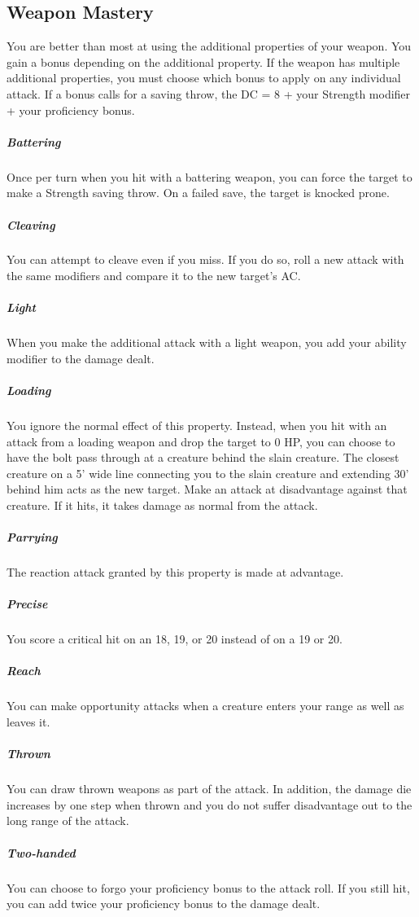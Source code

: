 \subsection{Weapon Mastery}

You are better than most at using the additional properties of your weapon. You gain a bonus depending on the additional property. If the weapon has multiple additional properties, you must choose which bonus to apply on any individual attack. If a bonus calls for a saving throw, the DC = 8 + your Strength modifier + your proficiency bonus.

\subparagraph*{Battering} Once per turn when you hit with a battering weapon, you can force the target to make a Strength saving throw. On a failed save, the target is knocked prone.

\subparagraph*{Cleaving} You can attempt to cleave even if you miss. If you do so, roll a new attack with the same modifiers and compare it to the new target's AC.

\subparagraph*{Light} When you make the additional attack with a light weapon, you add your ability modifier to the damage dealt.

\subparagraph*{Loading} You ignore the normal effect of this property. Instead, when you hit with an attack from a loading weapon and drop the target to 0 HP, you can choose to have the bolt pass through at a creature behind the slain creature. The closest creature on a 5' wide line connecting you to the slain creature and extending 30' behind him acts as the new target. Make an attack at disadvantage against that creature. If it hits, it takes damage as normal from the attack.

\subparagraph*{Parrying} The reaction attack granted by this property is made at advantage.

\subparagraph*{Precise} You score a critical hit on an 18, 19, or 20 instead of on a 19 or 20.

\subparagraph*{Reach} You can make opportunity attacks when a creature enters your range as well as leaves it.

\subparagraph*{Thrown} You can draw thrown weapons as part of the attack. In addition, the damage die increases by one step when thrown and you do not suffer disadvantage out to the long range of the attack.

\subparagraph*{Two-handed} You can choose to forgo your proficiency bonus to the attack roll. If you still hit, you can add twice your proficiency bonus to the damage dealt.

